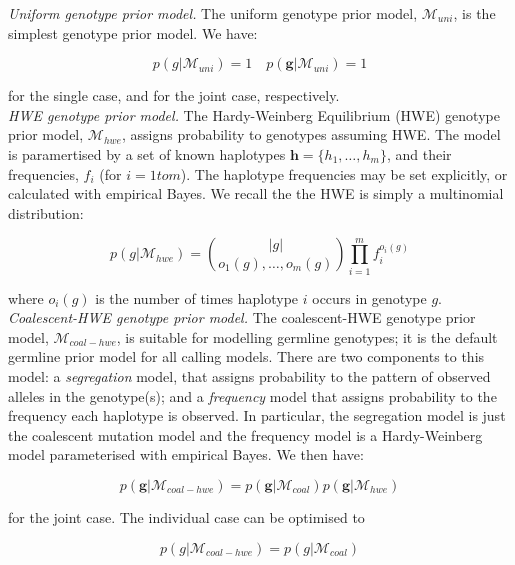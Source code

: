 \documentclass[notitlepage, twocolumn]{article}
\begin{document}
\emph{Uniform genotype prior model.} The uniform genotype prior model, $\mathcal{M}_{uni}$, is the simplest genotype prior model. We have:

\begin{equation*}
    p(g | \mathcal{M}_{uni}) = 1 \quad p(\boldsymbol{g} | \mathcal{M}_{uni}) = 1
\end{equation*}

for the single case, and for the joint case, respectively. \\

\emph{HWE genotype prior model.} The Hardy-Weinberg Equilibrium (HWE) genotype prior model, $\mathcal{M}_{hwe}$, assigns probability to genotypes assuming HWE. The model is paramertised by a set of known haplotypes $\boldsymbol{h} = \{h_1, \dots, h_m\}$, and their frequencies, $f_i$ (for $i = 1 to m$). The haplotype frequencies may be set explicitly, or calculated with empirical Bayes. We recall the the HWE is simply a multinomial distribution:

\begin{equation*}
    p(g | \mathcal{M}_{hwe}) = \binom{|g|}{o_1(g), \dots, o_m(g)} \prod_{i=1}^m f_i^{o_i(g)}
\end{equation*}

where $o_i(g)$ is the number of times haplotype $i$ occurs in genotype $g$.\\

\emph{Coalescent-HWE genotype prior model.} The coalescent-HWE genotype prior model, $\mathcal{M}_{coal-hwe}$, is suitable for modelling germline genotypes; it is the default germline prior model for all calling models. There are two components to this model: a \emph{segregation} model, that assigns probability to the pattern of observed alleles in the genotype(s); and a \emph{frequency} model that assigns probability to the frequency each haplotype is observed. In particular, the segregation model is just the coalescent mutation model and the frequency model is a Hardy-Weinberg model parameterised with empirical Bayes. We then have:

\begin{equation*}
    p(\boldsymbol{g} | \mathcal{M}_{coal-hwe}) = p(\boldsymbol{g} | \mathcal{M}_{coal}) p(\boldsymbol{g} | \mathcal{M}_{hwe})
\end{equation*}

for the joint case. The individual case can be optimised to

\begin{equation*}
    p(g | \mathcal{M}_{coal-hwe}) = p(g | \mathcal{M}_{coal})
\end{equation*}
\end{document}
